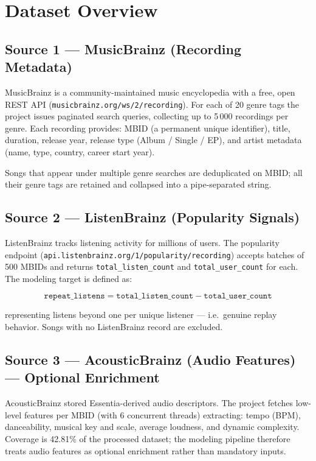 \documentclass[11pt, letterpaper]{article}
\begin{document}
\section{Dataset Overview}

\subsection{Source 1 — MusicBrainz (Recording Metadata)}

MusicBrainz is a community-maintained music encyclopedia with a free,
open REST API (\texttt{musicbrainz.org/ws/2/recording}). For each of 20
genre tags the project issues paginated search queries, collecting up to
5\,000 recordings per genre. Each recording provides: MBID (a permanent
unique identifier), title, duration, release year, release type (Album /
Single / EP), and artist metadata (name, type, country, career start year).

Songs that appear under multiple genre searches are deduplicated on MBID;
all their genre tags are retained and collapsed into a pipe-separated string.

\subsection{Source 2 — ListenBrainz (Popularity Signals)}

ListenBrainz tracks listening activity for millions of users.
The popularity endpoint (\texttt{api.listenbrainz.org/1/popularity/recording})
accepts batches of 500 MBIDs and returns \texttt{total\_listen\_count} and
\texttt{total\_user\_count} for each. The modeling target is defined as:

\[
\texttt{repeat\_listens} = \texttt{total\_listen\_count} - \texttt{total\_user\_count}
\]

representing listens beyond one per unique listener — i.e.\ genuine replay
behavior. Songs with no ListenBrainz record are excluded.

\subsection{Source 3 — AcousticBrainz (Audio Features) — Optional Enrichment}

AcousticBrainz stored Essentia-derived audio descriptors.
The project fetches low-level features per MBID (with 6 concurrent threads)
extracting: tempo (BPM), danceability, musical key and scale, average loudness,
and dynamic complexity. Coverage is 42.81\% of the processed dataset;
the modeling pipeline therefore treats audio features as optional enrichment
rather than mandatory inputs.
\end{document}
